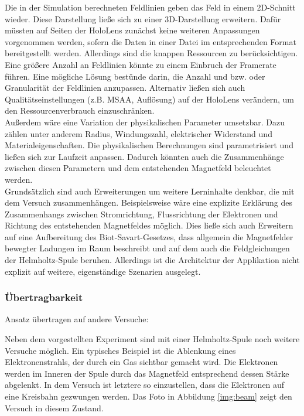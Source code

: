 Die in der Simulation berechneten Feldlinien geben das Feld in einem 2D-Schnitt wieder. Diese Darstellung ließe sich zu einer 3D-Darstellung erweitern. Dafür müssten auf Seiten der HoloLens zunächst keine weiteren Anpassungen vorgenommen werden, sofern die Daten in einer Datei im entsprechenden Format bereitgestellt werden. Allerdings sind die knappen Ressourcen zu berücksichtigen. Eine größere Anzahl an Feldlinien könnte zu einem Einbruch der Framerate führen. Eine mögliche Lösung bestünde darin, die Anzahl und bzw. oder Granularität der Feldlinien anzupassen. Alternativ ließen sich auch Qualitätseinstellungen (z.B. MSAA, Auflösung) auf der HoloLens verändern, um den Ressourcenverbrauch einzuschränken.\\

Außerdem wäre eine Variation der physikalischen Parameter umsetzbar. Dazu zählen unter anderem Radius, Windungszahl, elektrischer Widerstand und Materialeigenschaften. Die physikalischen Berechnungen sind parametrisiert und ließen sich zur Laufzeit anpassen. Dadurch könnten auch die Zusammenhänge zwischen diesen Parametern und dem entstehenden Magnetfeld beleuchtet werden.\\

Grundsätzlich sind auch Erweiterungen um weitere Lerninhalte denkbar, die mit dem Versuch zusammenhängen. Beispielsweise wäre eine explizite Erklärung des Zusammenhangs zwischen Stromrichtung, Flussrichtung der Elektronen und Richtung des entstehenden Magnetfeldes möglich. Dies ließe sich auch Erweitern auf eine Aufbereitung des Biot-Savart-Gesetzes, dass allgemein die Magnetfelder bewegter Ladungen im Raum beschreibt und auf dem auch die Feldgleichungen der Helmholtz-Spule beruhen. Allerdings ist die Architektur der Applikation nicht explizit auf weitere, eigenständige Szenarien ausgelegt.\\

\subsubsection{Übertragbarkeit}
Ansatz übertragen auf andere Versuche:

Neben dem vorgestellten Experiment sind mit einer Helmholtz-Spule noch weitere Versuche möglich. Ein typisches Beispiel ist die Ablenkung eines Elektronenstrahls, der durch ein Gas sichtbar gemacht wird. Die Elektronen werden im Inneren der Spule durch das Magnetfeld entsprechend dessen Stärke abgelenkt. In dem Versuch ist letztere so einzustellen, dass die Elektronen auf eine Kreisbahn gezwungen werden. Das Foto in Abbildung \ref{img:beam} zeigt den Versuch in diesem Zustand.\\

